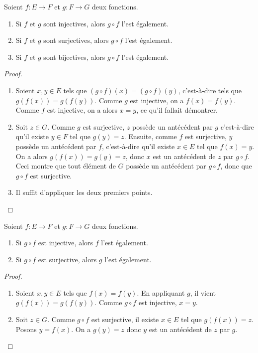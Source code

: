 \begin{proposition}
Soient $f : E\to F$ et $g : F\to G$ deux fonctions.
\begin{enumerate}
\item Si $f$ et $g$ sont injectives, alors $g\circ f$ l'est également.
\item Si $f$ et $g$ sont surjectives, alors $g\circ f$ l'est également.
\item Si $f$ et $g$ sont bijectives, alors $g\circ f$ l'est également.
\end{enumerate}
\end{proposition}
\begin{proof}
\begin{enumerate}
\item Soient $x, y \in E$ tels que $(g\circ f)(x) = (g\circ f)(y) $, c'est-à-dire tels que $g(f(x))=g(f(y))$. Comme $g$ est injective, on a $f(x)=f(y)$. Comme $f$ est injective, on a alors $x=y$, ce qu'il fallait démontrer.
\item Soit $z\in G$. Comme $g$ est surjective, $z$ possède un antécédent par $g$ c'est-à-dire qu'il existe $y\in F$ tel que $g(y)=z$. Ensuite, comme $f$ est surjective, $y$ possède un antécédent par $f$, c'est-à-dire qu'il existe $x\in E$ tel que $f(x)=y$. On a alors $g(f(x)) = g(y)=z$, donc $x$ est un antécédent de $z$ par $g\circ f$. Ceci montre que tout élément de $G$ possède un antécédent par $g\circ f$, donc que $g\circ f$ est surjective.
\item Il suffit d'appliquer les deux premiers points.
\end{enumerate}
\end{proof}

\begin{proposition}
Soient $f : E\to F$ et $g : F\to G$ deux fonctions.
\begin{enumerate}
\item Si $g\circ f$ est injective, alors $f$ l'est également.
\item Si $g\circ f$ est surjective, alors $g$ l'est également.
\end{enumerate}
\end{proposition}
\begin{proof}
\begin{enumerate}
\item Soient $x, y\in E$ tels que $f(x)=f(y)$. En appliquant $g$, il vient $g(f(x))=g(f(y))$. Comme $g\circ f$ est injective, $x=y$.
\item Soit $z\in G$. Comme $g\circ f$ est surjective, il existe $x\in E$ tel que $g(f(x))=z$. Posons $y = f(x)$. On a $g(y)=z$ donc $y$ est un antécédent de $z$ par $g$.
\end{enumerate}
\end{proof}




